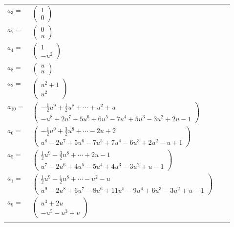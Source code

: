 \documentclass[1p]{elsarticle_modified}
\theoremstyle{definition}
\begin{document}
\begin{tabular}{m{7pt} m{180pt} m{7pt} m{180pt} }
\flushright $a_{3}=$&$\begin{pmatrix}1\\0\end{pmatrix}$ \\
\flushright $a_{7}=$&$\begin{pmatrix}0\\u\end{pmatrix}$ \\
\flushright $a_{4}=$&$\begin{pmatrix}1\\- u^2\end{pmatrix}$ \\
\flushright $a_{8}=$&$\begin{pmatrix}u\\u\end{pmatrix}$ \\
\flushright $a_{2}=$&$\begin{pmatrix}u^2+1\\u^2\end{pmatrix}$ \\
\flushright $a_{10}=$&$\begin{pmatrix}-\frac{1}{2} u^9+\frac{1}{2} u^8+\cdots+u^2+u\\- u^8+2 u^7-5 u^6+6 u^5-7 u^4+5 u^3-3 u^2+2 u-1\end{pmatrix}$ \\
\flushright $a_{6}=$&$\begin{pmatrix}-\frac{1}{2} u^9+\frac{3}{2} u^8+\cdots-2 u+2\\u^8-2 u^7+5 u^6-7 u^5+7 u^4-6 u^3+2 u^2- u+1\end{pmatrix}$ \\
\flushright $a_{5}=$&$\begin{pmatrix}\frac{1}{2} u^9-\frac{3}{2} u^8+\cdots+2 u-1\\u^7-2 u^6+4 u^5-5 u^4+4 u^3-3 u^2+u-1\end{pmatrix}$ \\
\flushright $a_{1}=$&$\begin{pmatrix}\frac{1}{2} u^9-\frac{1}{2} u^8+\cdots- u^2- u\\u^9-2 u^8+6 u^7-8 u^6+11 u^5-9 u^4+6 u^3-3 u^2+u-1\end{pmatrix}$ \\
\flushright $a_{9}=$&$\begin{pmatrix}u^3+2 u\\- u^5- u^3+u\end{pmatrix}$\\&\end{tabular}
\end{document}
